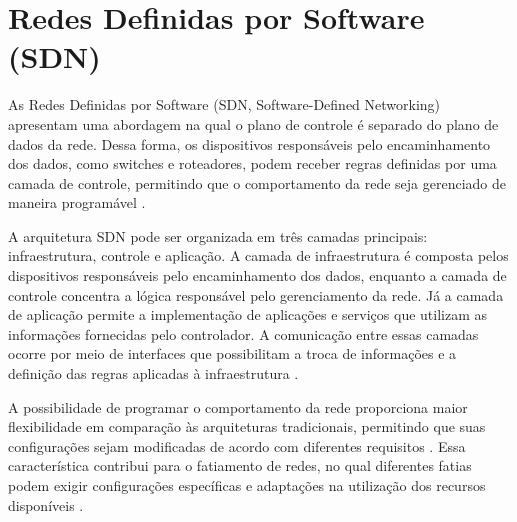 \section{Redes Definidas por Software (SDN)}

As Redes Definidas por Software (SDN, Software-Defined Networking) apresentam uma abordagem na qual o plano de controle é separado do plano de dados da rede. Dessa forma, os dispositivos responsáveis pelo encaminhamento dos dados, como switches e roteadores, podem receber regras definidas por uma camada de controle, permitindo que o comportamento da rede seja gerenciado de maneira programável \cite{bera2017software}.

A arquitetura SDN pode ser organizada em três camadas principais: infraestrutura, controle e aplicação. A camada de infraestrutura é composta pelos dispositivos responsáveis pelo encaminhamento dos dados, enquanto a camada de controle concentra a lógica responsável pelo gerenciamento da rede. Já a camada de aplicação permite a implementação de aplicações e serviços que utilizam as informações fornecidas pelo controlador. A comunicação entre essas camadas ocorre por meio de interfaces que possibilitam a troca de informações e a definição das regras aplicadas à infraestrutura \cite{bera2017software}.

A possibilidade de programar o comportamento da rede proporciona maior flexibilidade em comparação às arquiteturas tradicionais, permitindo que suas configurações sejam modificadas de acordo com diferentes requisitos \cite{bera2017software}. Essa característica contribui para o fatiamento de redes, no qual diferentes fatias podem exigir configurações específicas e adaptações na utilização dos recursos disponíveis \cite{gomes2020strategies}.
